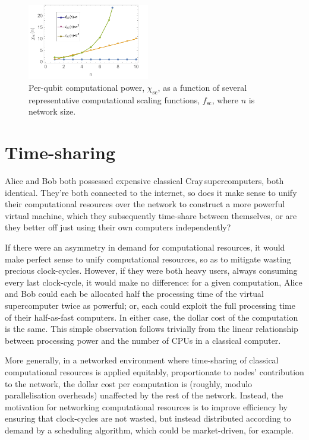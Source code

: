 \begin{figure}[htb!]
	\includegraphics[clip=true, width=0.475\textwidth]{network_price_scaling_factor}
	\captionspacefig \caption{Per-qubit computational power, $\chi_\mathrm{sc}$, as a function of several representative computational scaling functions, $f_\mathrm{sc}$, where $n$ is network size.} \label{fig:NPSF}
\end{figure}

%
%

\section{Time-sharing}\label{sec:time_share}

 Alice and Bob both possessed expensive classical Cray\texttrademark\,supercomputers, both identical. They're both connected to the internet, so does it make sense to unify their computational resources over the network to construct a more powerful virtual machine, which they subsequently time-share between themselves, or are they better off just using their own computers independently?

If there were an asymmetry in demand for computational resources, it would make perfect sense to unify computational resources, so as to mitigate wasting precious clock-cycles. However, if they were both heavy users, always consuming every last clock-cycle, it would make no difference: for a given computation, Alice and Bob could each be allocated half the processing time of the virtual supercomputer twice as powerful; or, each could exploit the full processing time of their half-as-fast computers. In either case, the dollar cost of the computation is the same. This simple observation follows trivially from the linear relationship between processing power and the number of CPUs in a classical computer.

More generally, in a networked environment where time-sharing of classical computational resources is applied equitably, proportionate to nodes' contribution to the network, the dollar cost per computation is (roughly, modulo parallelisation overheads) unaffected by the rest of the network. Instead, the motivation for networking computational resources is to improve efficiency by ensuring that clock-cycles are not wasted, but instead distributed according to demand by a scheduling algorithm, which could be market-driven, for example.

